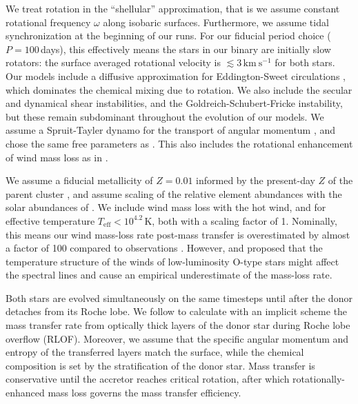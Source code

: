 \documentclass[twocolumn,twocolappendix,trackchanges]{aastex63}
\newcommand{\kms}{{\mathrm{km\ s^{-1}}}}
\begin{document}
We treat rotation in the ``shellular'' approximation, that is we assume constant
rotational frequency $\omega$ along isobaric surfaces. Furthermore, we assume
tidal synchronization at the beginning of our runs. For our fiducial
period choice ($P=100$\,days), this effectively means the stars
in our binary are initially slow rotators: the surface averaged
rotational velocity is $\lesssim3\,\kms$ for both stars. Our models include a
diffusive approximation for Eddington-Sweet circulations
\citep{sweet:50}, which dominates the chemical mixing due to
rotation. We also include the secular and dynamical shear
instabilities, and the Goldreich-Schubert-Fricke instability, but
these remain subdominant throughout the evolution of our models.  We assume a
Spruit-Tayler dynamo for the transport of angular momentum
\citep{spruit:02}, and chose the same free parameters as
\cite{heger:00}. This also includes the rotational enhancement of wind
mass loss as in \cite{langer:98}.

We assume a fiducial metallicity of $Z=0.01$ informed by the
present-day $Z$ of the parent cluster \citep{murphy:21}, and assume
scaling of the relative element abundances with the solar abundances
of \cite{grevesse:98}. We include wind mass loss with the
\cite{vink:00,vink:01} hot wind, and \cite{dejager:88} for effective
temperature $T_\mathrm{eff}<10^{4.2}$\,K, both with a scaling
factor of 1. Nominally, this means our wind mass-loss rate post-mass
transfer is overestimated by almost a factor of 100 compared to
observations \citep[weak wind problem, see][]{marcolino:09}.  However,
\cite{lucy:12} and \cite{lagae:21} proposed that the temperature
structure of the winds of low-luminosity O-type stars might affect the
spectral lines and cause an empirical underestimate of the mass-loss
rate.

Both stars are evolved simultaneously on the same timesteps until
after the donor detaches from its Roche lobe. We follow \cite{kolb:90}
to calculate with an implicit scheme the mass transfer rate from optically thick layers of the
donor star during Roche lobe overflow (RLOF). Moreover, we assume that
the specific angular momentum and entropy of the transferred layers
match the surface, while the chemical composition is
set by the stratification of the donor star. Mass transfer is
conservative until the accretor reaches critical rotation, after which
rotationally-enhanced mass loss governs the mass transfer efficiency.
\end{document}
